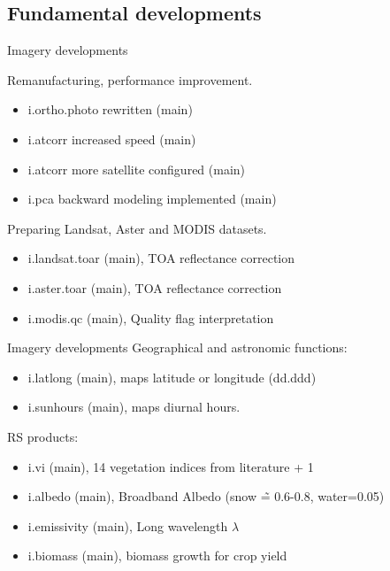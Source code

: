\documentclass[xcolor=dvipsnames,beamer]{beamer} %
\begin{document}
\subsection{Fundamental developments}
\begin{frame}[fragile]{Imagery developments}

Remanufacturing, performance improvement.\\

\begin{itemize}
 \item i.ortho.photo rewritten (main)
 \item i.atcorr increased speed (main)
 \item i.atcorr more satellite configured (main)
 \item i.pca backward modeling implemented (main) 
\end{itemize}

Preparing Landsat, Aster and MODIS datasets.\\

\begin{itemize}
 \item i.landsat.toar (main), TOA reflectance correction
 \item i.aster.toar (main), TOA reflectance correction
 \item i.modis.qc (main), Quality flag interpretation
\end{itemize}


\end{frame}

\begin{frame}[fragile]{Imagery developments}
Geographical and astronomic functions:\\

\begin{itemize}
 \item i.latlong (main), maps latitude or longitude (dd.ddd)
 \item i.sunhours (main), maps diurnal hours.
\end{itemize}

RS products:\\

\begin{itemize}
 \item i.vi (main), 14 vegetation indices from literature + 1
 \item i.albedo (main), Broadband Albedo (snow \~= 0.6-0.8, water=0.05)
 \item i.emissivity (main), Long wavelength $\lambda$
 \item i.biomass (main), biomass growth for crop yield
\end{itemize}


\end{frame}
\end{document}
